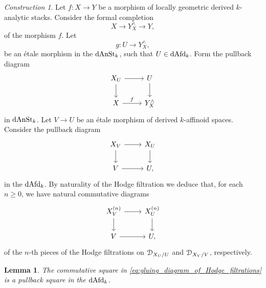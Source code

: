 \documentclass[10pt,a4paper,reqno]{amsart} %
\theoremstyle{plain}
\newtheorem{lem}[thm]{Lemma}
\theoremstyle{definition}
\theoremstyle{remark}
\numberwithin{equation}{section}
\newtheorem{construction}[thm]{Construction}
\begin{document}
\begin{construction}
    Let $f \colon X \to Y$ be a morphism of locally geometric derived $k$-analytic stacks. Consider the formal completion
        \[
            X \to Y^{\wedge}_X \to Y,  
        \] 
    of the morphism $f$. Let 
        \[
            g \colon U \to Y^\wedge_X,  
        \]
    be an \'etale morphism in the \infcat $\mathrm{dAnSt}_k$, such that $U \in \mathrm{dAfd}_k$. Form the pullback diagram
        \[
        \begin{tikzcd}
            X_U \ar{r} \ar{d} & U \ar{d} \\
            X \ar{r}{f} & Y^\wedge_X
        \end{tikzcd}
        \]
    in $\mathrm{dAnSt}_k$. Let $V \to U$ be an \'etale morphism of derived $k$-affinoid spaces. Consider the pullback diagram
        \[
        \begin{tikzcd}
            X_V \ar{r} \ar{d} & X_U \ar{d} \\
            V \ar{r} & U,  
        \end{tikzcd}
        \]
    in the \infcat $\mathrm{dAfd}_k$. By naturality of the Hodge filtration we deduce that, for each $n \ge 0$, we have natural commutative diagrams
        \begin{equation} \label{eq:gluing_diagram_of_Hodge_filtrations}
        \begin{tikzcd}
            X_V^{(n)} \ar{r} \ar{d} & X_U^{(n)} \ar{d} \\
            V \ar{r} & U,
        \end{tikzcd}
        \end{equation}
    of the $n$-th pieces of the Hodge filtrations on $\mathcal D_{X_U/ U}$ and $\mathcal D_{X_V/ V}$, respectively.
\end{construction}


\begin{lem} \label{lem:preservation_of_Hodge_filtration_under_pullback}
    The commutative square in \eqref{eq:gluing_diagram_of_Hodge_filtrations} is a pullback square in the \infcat $\mathrm{dAfd}_k$.
\end{lem}
\end{document}
